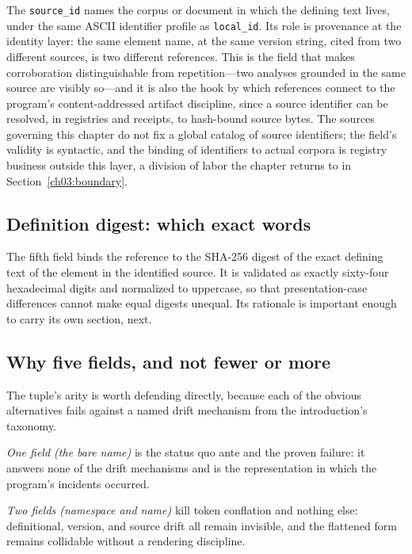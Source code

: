 The \texttt{source\_id} names the corpus or document in which the
defining text lives, under the same ASCII identifier profile as
\texttt{local\_id}. Its role is provenance at the identity layer:
the same element name, at the same version string, cited from two
different sources, is two different references. This is the field
that makes corroboration distinguishable from repetition---two
analyses grounded in the same source are visibly so---and it is
also the hook by which references connect to the program's
content-addressed artifact discipline, since a source identifier
can be resolved, in registries and receipts, to hash-bound source
bytes. The sources governing this chapter do not fix a global
catalog of source identifiers; the field's validity is syntactic,
and the binding of identifiers to actual corpora is registry
business outside this layer, a division of labor the chapter
returns to in Section~\ref{ch03:boundary}.

\subsection{Definition digest: which exact words}\label{ch03:field-defhash}

The fifth field binds the reference to the SHA-256 digest of the
exact defining text of the element in the identified source. It is
validated as exactly sixty-four hexadecimal digits and normalized
to uppercase, so that presentation-case differences cannot make
equal digests unequal. Its rationale is important enough to carry
its own section, next.

\subsection{Why five fields, and not fewer or more}\label{ch03:whyfive}

The tuple's arity is worth defending directly, because each of the
obvious alternatives fails against a named drift mechanism from
the introduction's taxonomy.

\emph{One field (the bare name)} is the status quo ante and the
proven failure: it answers none of the drift mechanisms and is the
representation in which the program's incidents occurred.

\emph{Two fields (namespace and name)} kill token conflation and
nothing else: definitional, version, and source drift all remain
invisible, and the flattened form remains collidable without a
rendering discipline.

